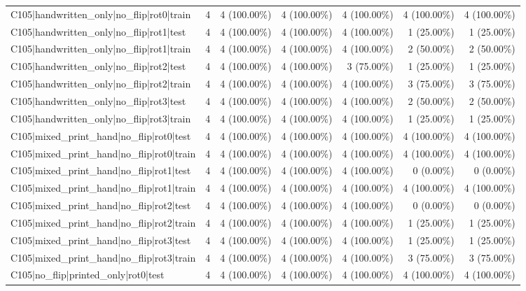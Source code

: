 \begin{longtable}{>{\raggedright\arraybackslash}p{5cm}rrrrrr}
C105|handwritten\_only|no\_flip|rot0|train & 4 & 4 (100.00\%) & 4 (100.00\%) & 4 (100.00\%) & 4 (100.00\%) & 4 (100.00\%) \\
C105|handwritten\_only|no\_flip|rot1|test & 4 & 4 (100.00\%) & 4 (100.00\%) & 4 (100.00\%) & 1 (25.00\%) & 1 (25.00\%) \\
C105|handwritten\_only|no\_flip|rot1|train & 4 & 4 (100.00\%) & 4 (100.00\%) & 4 (100.00\%) & 2 (50.00\%) & 2 (50.00\%) \\
C105|handwritten\_only|no\_flip|rot2|test & 4 & 4 (100.00\%) & 4 (100.00\%) & 3 (75.00\%) & 1 (25.00\%) & 1 (25.00\%) \\
C105|handwritten\_only|no\_flip|rot2|train & 4 & 4 (100.00\%) & 4 (100.00\%) & 4 (100.00\%) & 3 (75.00\%) & 3 (75.00\%) \\
C105|handwritten\_only|no\_flip|rot3|test & 4 & 4 (100.00\%) & 4 (100.00\%) & 4 (100.00\%) & 2 (50.00\%) & 2 (50.00\%) \\
C105|handwritten\_only|no\_flip|rot3|train & 4 & 4 (100.00\%) & 4 (100.00\%) & 4 (100.00\%) & 1 (25.00\%) & 1 (25.00\%) \\
C105|mixed\_print\_hand|no\_flip|rot0|test & 4 & 4 (100.00\%) & 4 (100.00\%) & 4 (100.00\%) & 4 (100.00\%) & 4 (100.00\%) \\
C105|mixed\_print\_hand|no\_flip|rot0|train & 4 & 4 (100.00\%) & 4 (100.00\%) & 4 (100.00\%) & 4 (100.00\%) & 4 (100.00\%) \\
C105|mixed\_print\_hand|no\_flip|rot1|test & 4 & 4 (100.00\%) & 4 (100.00\%) & 4 (100.00\%) & 0 (0.00\%) & 0 (0.00\%) \\
C105|mixed\_print\_hand|no\_flip|rot1|train & 4 & 4 (100.00\%) & 4 (100.00\%) & 4 (100.00\%) & 4 (100.00\%) & 4 (100.00\%) \\
C105|mixed\_print\_hand|no\_flip|rot2|test & 4 & 4 (100.00\%) & 4 (100.00\%) & 4 (100.00\%) & 0 (0.00\%) & 0 (0.00\%) \\
C105|mixed\_print\_hand|no\_flip|rot2|train & 4 & 4 (100.00\%) & 4 (100.00\%) & 4 (100.00\%) & 1 (25.00\%) & 1 (25.00\%) \\
C105|mixed\_print\_hand|no\_flip|rot3|test & 4 & 4 (100.00\%) & 4 (100.00\%) & 4 (100.00\%) & 1 (25.00\%) & 1 (25.00\%) \\
C105|mixed\_print\_hand|no\_flip|rot3|train & 4 & 4 (100.00\%) & 4 (100.00\%) & 4 (100.00\%) & 3 (75.00\%) & 3 (75.00\%) \\
C105|no\_flip|printed\_only|rot0|test & 4 & 4 (100.00\%) & 4 (100.00\%) & 4 (100.00\%) & 4 (100.00\%) & 4 (100.00\%) \\

\end{longtable}
